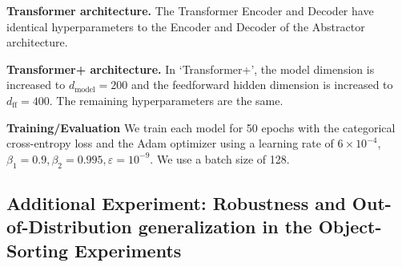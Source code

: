 \textbf{Transformer architecture.} The Transformer Encoder and Decoder have identical hyperparameters to the Encoder and Decoder of the Abstractor architecture.

\textbf{Transformer+ architecture.} In `Transformer+', the model dimension is increased to $d_\mathrm{model} = 200$ and the feedforward hidden dimension is increased to $d_{\mathrm{ff}} = 400$. The remaining hyperparameters are the same.

\textbf{Training/Evaluation} We train each model for 50 epochs with the categorical cross-entropy loss and the Adam optimizer using a learning rate of $6 \times 10^{-4}$, $\beta_1 = 0.9, \beta_2 = 0.995, \varepsilon = 10^{-9}$. We use a batch size of 128.

\subsection{Additional Experiment: Robustness and Out-of-Distribution generalization in the Object-Sorting Experiments}

